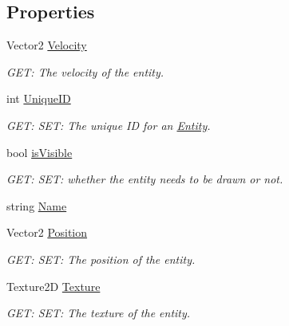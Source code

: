 \subsection*{Properties}
\begin{DoxyCompactItemize}
\item 
Vector2 \hyperlink{a00314_a1821405e931e09c3a3b264d6b9fd9011}{Velocity}
\begin{DoxyCompactList}\small\item\em G\+ET\+: The velocity of the entity. \end{DoxyCompactList}\item 
int \hyperlink{a00314_a2f119510debb21928206de4a3c47fc00}{Unique\+ID}
\begin{DoxyCompactList}\small\item\em G\+ET\+: S\+ET\+: The unique ID for an \hyperlink{a00314}{Entity}. \end{DoxyCompactList}\item 
bool \hyperlink{a00314_a519bb560bd5dda64938b48d28c368508}{is\+Visible}
\begin{DoxyCompactList}\small\item\em G\+ET\+: S\+ET\+: whether the entity needs to be drawn or not. \end{DoxyCompactList}\item 
string \hyperlink{a00314_a2f3828a9c39ae5b5643ca1debd254384}{Name}
\item 
Vector2 \hyperlink{a00314_a5324a089780eefc8749e5794a47a53be}{Position}
\begin{DoxyCompactList}\small\item\em G\+ET\+: S\+ET\+: The position of the entity. \end{DoxyCompactList}\item 
Texture2D \hyperlink{a00314_a2ab6afa4c8cc6f8dede6c2a18f483970}{Texture}
\begin{DoxyCompactList}\small\item\em G\+ET\+: S\+ET\+: The texture of the entity. \end{DoxyCompactList}\item 

\end{DoxyCompactItemize}
